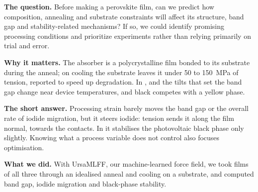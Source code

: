 \begin{tcolorbox}[colback=boxbg, colframe=boxframe, boxrule=0.8pt, arc=2pt, left=8pt, right=8pt, top=6pt, bottom=6pt,
  title={\textbf{At a glance}}, fonttitle=\large, coltitle=white]
\small
\textbf{The question.} Before making a perovskite film, can we predict how composition, annealing and substrate constraints will affect its structure, band gap and stability-related mechanisms? If so, we could identify promising processing conditions and prioritize experiments rather than relying primarily on trial and error.

\textbf{Why it matters.} The absorber is a polycrystalline film bonded to its substrate during the anneal; on
cooling the substrate leaves it under 50 to \SI{150}{MPa} of tension, reported to speed up degradation. In
\CsSnI{}, \MASnI{} and \FASnI{} the tilts that set the band gap change near device temperatures, and
black \CsSnI{} competes with a yellow phase.

\textbf{The short answer.} Processing strain barely moves the band gap or the overall rate of iodide migration, but it steers iodide: tension sends it along the film normal, towards the contacts. In \CsSnI{} it stabilises the photovoltaic black phase only slightly. Knowing what a process variable does not control also focuses optimisation.

\textbf{What we did.} With UrsaMLFF, our machine-learned force field, we took films of all three through an idealised anneal and cooling on a substrate, and computed band gap, iodide migration and black-phase stability.


\end{tcolorbox}
